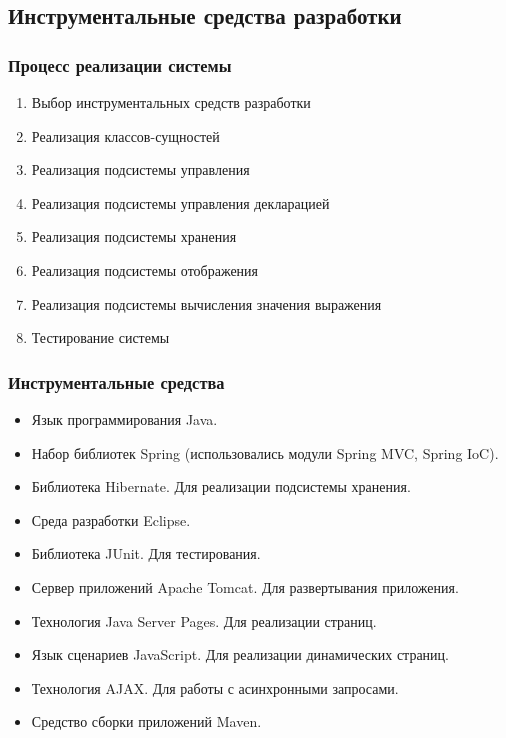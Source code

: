 \documentclass[xcolor=pdftex, dvipsnames, table]{beamer}
\begin{document}
\subsection{Инструментальные средства разработки}
\begin{frame}
  \frametitle{Процесс реализации системы}
  \begin{enumerate}
    \item Выбор инструментальных средств разработки
    \item Реализация классов-сущностей
    \item Реализация подсистемы управления
    \item Реализация подсистемы управления декларацией
    \item Реализация подсистемы хранения
    \item Реализация подсистемы отображения
    \item Реализация подсистемы вычисления значения выражения
    \item Тестирование системы
  \end{enumerate}
\end{frame}
\begin{frame}
  \frametitle{Инструментальные средства}
  \begin{itemize}
    \item Язык программирования Java.
    \item Набор библиотек Spring (использовались модули Spring MVC, Spring IoC).
    \item Библиотека Hibernate. Для реализации подсистемы хранения.
    \item Среда разработки Eclipse.
    \item Библиотека JUnit. Для тестирования.
    \item Сервер приложений Apache Tomcat. Для развертывания приложения.
    \item Технология Java Server Pages. Для реализации страниц.
    \item Язык сценариев JavaScript. Для реализации динамических страниц.
    \item Технология AJAX. Для работы с асинхронными запросами.
    \item Средство сборки приложений Maven.
  \end{itemize}
\end{frame}
\end{document}
